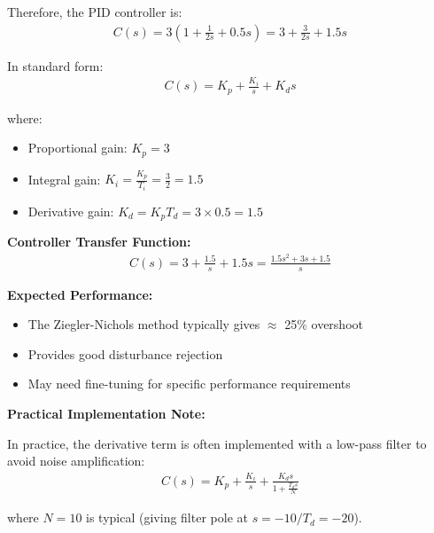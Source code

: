 \documentclass[11pt,a4paper]{article}
\begin{document}
Therefore, the PID controller is:
\begin{align}
  C(s) = 3\left(1 + \frac{1}{2s} + 0.5s\right) = 3 + \frac{3}{2s} + 1.5s
\end{align}

In standard form:
\begin{align}
  C(s) = K_p + \frac{K_i}{s} + K_d s
\end{align}

where:
\begin{itemize}
  \item Proportional gain: $K_p = 3$
  \item Integral gain: $K_i = \frac{K_p}{T_i} = \frac{3}{2} = 1.5$
  \item Derivative gain: $K_d = K_p T_d = 3 \times 0.5 = 1.5$
\end{itemize}

\textbf{Controller Transfer Function:}
\begin{align}
  C(s) = 3 + \frac{1.5}{s} + 1.5s = \frac{1.5s^2 + 3s + 1.5}{s}
\end{align}

\textbf{Expected Performance:}
\begin{itemize}
  \item The Ziegler-Nichols method typically gives $\approx$ 25\% overshoot
  \item Provides good disturbance rejection
  \item May need fine-tuning for specific performance requirements
\end{itemize}

\textbf{Practical Implementation Note:}

In practice, the derivative term is often implemented with a low-pass filter to avoid noise amplification:
\begin{align}
  C(s) = K_p + \frac{K_i}{s} + \frac{K_d s}{1 + \frac{T_d s}{N}}
\end{align}

where $N = 10$ is typical (giving filter pole at $s = -10/T_d = -20$).
\end{document}

